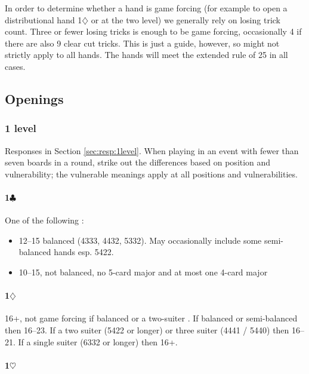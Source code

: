 \documentclass[a4paper,14pt]{extarticle}
\begin{document}
In order to determine whether a hand is game forcing (for example to open a
distributional hand 1$\diamondsuit$ or at the two level) we generally
rely on losing trick count. Three or fewer losing tricks is enough to be game
forcing, occasionally 4 if there are also 9 clear cut tricks. This is just a
guide, however, so might not strictly apply to all hands. The hands will meet
the extended rule of 25 in all cases.

\newpage

\subsection{Openings}
\label{sec:openings}

\subsubsection{1 level}
\label{sec:open:1level}

Responses in Section \ref{sec:resp:1level}. When playing in an event with fewer
than seven boards in a round, strike out the differences based on position and
vulnerability; the vulnerable meanings apply at all positions and
vulnerabilities.

\paragraph{1$\clubsuit$}

One of the following :

\begin{itemize}
\item 12--15 balanced (4333, 4432, 5332). May occasionally include some semi-balanced hands esp. 5422.
\item 10--15, not balanced, no 5-card major and at most one 4-card major
\end{itemize}

\paragraph{1$\diamondsuit$}

16+, not game forcing if balanced or a two-suiter . If balanced or semi-balanced then 16--23. If a two suiter (5422 or longer) or three suiter (4441 / 5440) then 16--21. If a single suiter (6332 or longer) then 16+.

\paragraph{1$\heartsuit$}
\end{document}
